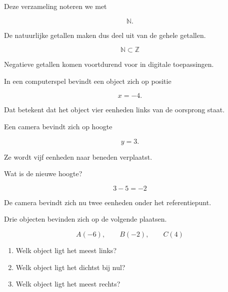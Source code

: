 \documentclass{ximera}
\begin{document}
Deze verzameling noteren we met

\[
\mathbb N.
\]

De natuurlijke getallen maken dus deel uit van de gehele getallen.

\[
\mathbb N \subset \mathbb Z
\]



Negatieve getallen komen voortdurend voor in digitale toepassingen.

\begin{example}
In een computerspel bevindt een object zich op positie

\[
x=-4.
\]

Dat betekent dat het object vier eenheden links van de oorsprong staat.
\end{example}

\begin{example}
Een camera bevindt zich op hoogte

\[
y=3.
\]

Ze wordt vijf eenheden naar beneden verplaatst.

Wat is de nieuwe hoogte?

\[
3-5=-2
\]

De camera bevindt zich nu twee eenheden onder het referentiepunt.
\end{example}



\begin{question}

    Drie objecten bevinden zich op de volgende plaatsen.
    
    \[
    A(-6),\qquad
    B(-2),\qquad
    C(4)
    \]
    
    \begin{enumerate}
    \item Welk object ligt het meest links?
    \item Welk object ligt het dichtst bij nul?
    \item Welk object ligt het meest rechts?
    \end{enumerate}
    
    \end{question}
\end{document}
